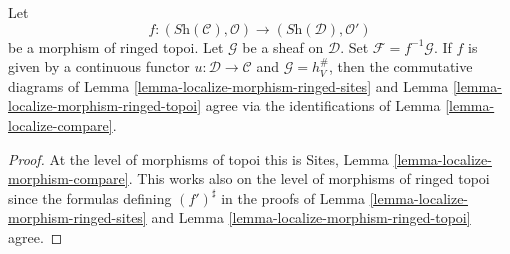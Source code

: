 \begin{lemma}
\label{lemma-localize-morphism-compare}
Let
$$
f :
(\textit{Sh}(\mathcal{C}), \mathcal{O})
\longrightarrow
(\textit{Sh}(\mathcal{D}), \mathcal{O}')
$$
be a morphism of ringed topoi.
Let $\mathcal{G}$ be a sheaf on $\mathcal{D}$.
Set $\mathcal{F} = f^{-1}\mathcal{G}$.
If $f$ is given by a continuous functor $u : \mathcal{D} \to \mathcal{C}$
and $\mathcal{G} = h_V^\#$, then the commutative diagrams of
Lemma \ref{lemma-localize-morphism-ringed-sites}
and
Lemma \ref{lemma-localize-morphism-ringed-topoi}
agree via the identifications of
Lemma \ref{lemma-localize-compare}.
\end{lemma}

\begin{proof}
At the level of morphisms of topoi this is
Sites, Lemma \ref{lemma-localize-morphism-compare}.
This works also on the level of morphisms of ringed topoi since
the formulas defining $(f')^\sharp$ in the proofs of
Lemma \ref{lemma-localize-morphism-ringed-sites}
and
Lemma \ref{lemma-localize-morphism-ringed-topoi}
agree.
\end{proof}


